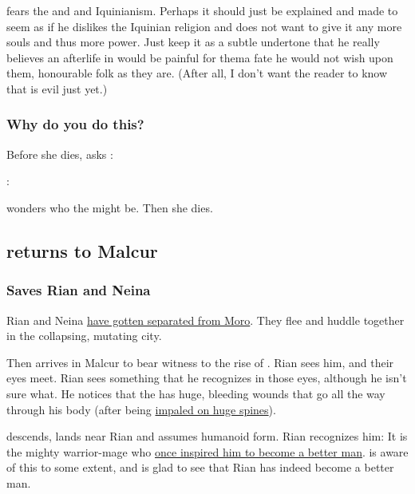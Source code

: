 \begin{garbage}
\Psyrex{} fears the \sephiroth{} and \iquin{} and Iquinianism. 
Perhaps it should just be explained and made to seem as if he dislikes the Iquinian religion and does not want to give it any more souls and thus more power. 
Just keep it as a subtle undertone that he really believes an afterlife in \iquin{} would be painful for them\dash a fate he would not wish upon them, honourable folk as they are. 
(After all, I don't want the reader to know that \Iquin{} is evil just yet.)





\subsubsection{Why do you do this?}
Before she dies, \Tiroco{} asks \Psyrex: 

\Psyrex: 

\Tiroco{} wonders who the \humansz{}  might be. Then she dies. 







\subsection{\Ishnaruchaefir{} returns to Malcur}
\subsubsection{Saves Rian and Neina}
Rian and Neina \hyperref[Rian and Neina are separated from Moro]{have gotten separated from Moro}. They flee and huddle together in the collapsing, mutating city. 

Then \Ishnaruchaefir{} arrives in Malcur to bear witness to the rise of \Nithdornazsh. Rian sees him, and their eyes meet. Rian sees something that he recognizes in those eyes, although he isn't sure what. He notices that the \dragon{} has huge, bleeding wounds that go all the way through his body (after being \hyperref[Ishnaruchaefir impaled by spines]{impaled on huge spines}). 

\Ishnaruchaefir{} descends, lands near Rian and assumes humanoid form. Rian recognizes him: It is the mighty warrior-mage who \hyperref[Rian is inspired by Ishnaruchaefir]{once inspired him to become a better man}. \Ishnaruchaefir{} is aware of this to some extent, and is glad to see that Rian has indeed become a better man. 


\end{garbage}
